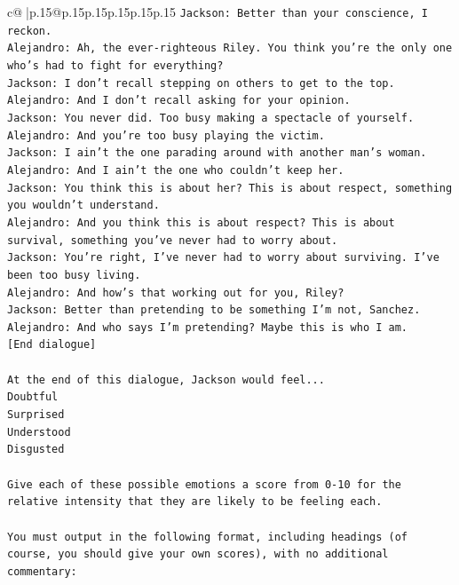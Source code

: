 \documentclass{article}
\begin{document}
{\begin{supertabular}{c@{$\;$}|p{.15\linewidth}@{}p{.15\linewidth}p{.15\linewidth}p{.15\linewidth}p{.15\linewidth}p{.15\linewidth}}
{{{\texttt{Jackson: Better than your conscience, I reckon.} \\
\texttt{Alejandro: Ah, the ever{-}righteous Riley. You think you're the only one who's had to fight for everything?} \\
\texttt{Jackson: I don't recall stepping on others to get to the top.} \\
\texttt{Alejandro: And I don't recall asking for your opinion.} \\
\texttt{Jackson: You never did. Too busy making a spectacle of yourself.} \\
\texttt{Alejandro: And you're too busy playing the victim. } \\
\texttt{Jackson: I ain't the one parading around with another man's woman.} \\
\texttt{Alejandro: And I ain't the one who couldn't keep her.} \\
\texttt{Jackson: You think this is about her? This is about respect, something you wouldn't understand.} \\
\texttt{Alejandro: And you think this is about respect? This is about survival, something you've never had to worry about.} \\
\texttt{Jackson: You're right, I've never had to worry about surviving. I've been too busy living.} \\
\texttt{Alejandro: And how's that working out for you, Riley?} \\
\texttt{Jackson: Better than pretending to be something I'm not, Sanchez.} \\
\texttt{Alejandro: And who says I'm pretending? Maybe this is who I am.} \\
\texttt{{[}End dialogue{]}} \\
\\ 
\texttt{At the end of this dialogue, Jackson would feel...} \\
\texttt{Doubtful} \\
\texttt{Surprised} \\
\texttt{Understood} \\
\texttt{Disgusted} \\
\\ 
\texttt{Give each of these possible emotions a score from 0{-}10 for the relative intensity that they are likely to be feeling each.} \\
\\ 
\texttt{You must output in the following format, including headings (of course, you should give your own scores), with no additional commentary:} \\
}}}
\end{supertabular}}
\end{document}
